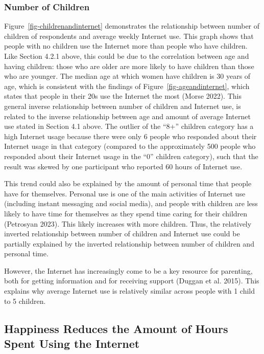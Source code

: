 \documentclass[
]{article}
\begin{document}
\hypertarget{number-of-children}{%
\subsubsection{Number of Children}\label{number-of-children}}

Figure~\ref{fig-childrenandinternet} demonstrates the relationship
between number of children of respondents and average weekly Internet
use. This graph shows that people with no children use the Internet more
than people who have children. Like Section 4.2.1 above, this could be
due to the correlation between age and having children: those who are
older are more likely to have children than those who are younger. The
median age at which women have children is 30 years of age, which is
consistent with the findings of Figure~\ref{fig-ageandinternet}, which
states that people in their 20s use the Internet the most (Morse 2022).
This general inverse relationship between number of children and
Internet use, is related to the inverse relationship between age and
amount of average Internet use stated in Section 4.1 above. The outlier
of the ``8+'' children category has a high Internet usage because there
were only 6 people who responded about their Internet usage in that
category (compared to the approximately 500 people who responded about
their Internet usage in the ``0'' children category), such that the
result was skewed by one participant who reported 60 hours of Internet
use.

This trend could also be explained by the amount of personal time that
people have for themselves. Personal use is one of the main activities
of Internet use (including instant messaging and social media), and
people with children are less likely to have time for themselves as they
spend time caring for their children (Petrosyan 2023). This likely
increases with more children. Thus, the relatively inverted relationship
between number of children and Internet use could be partially explained
by the inverted relationship between number of children and personal
time.

However, the Internet has increasingly come to be a key resource for
parenting, both for getting information and for receiving support
(Duggan et al. 2015). This explains why average Internet use is
relatively similar across people with 1 child to 5 children.

\hypertarget{sec-third-point}{%
\subsection{Happiness Reduces the Amount of Hours Spent Using the
Internet}\label{sec-third-point}}
\end{document}
